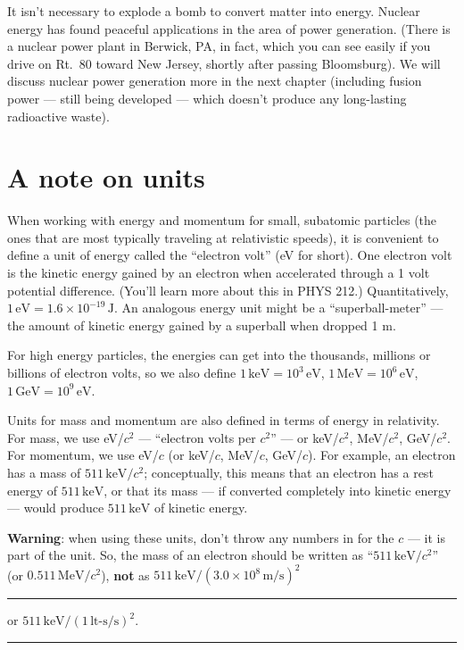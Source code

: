 \begin{itemize}
It isn't necessary to explode a bomb to convert matter into energy.
Nuclear energy has found peaceful applications in the area of power
generation. (There is a nuclear power plant in Berwick, PA, in fact,
which you can see easily if you drive on Rt.~80 toward New Jersey,
shortly after passing Bloomsburg).  We will discuss nuclear power
generation more in the next chapter (including fusion power ---  still
being developed --- which doesn't produce any long-lasting radioactive
waste).

\end{itemize}

\section{A note on units}
\label{sec:rel-units}

When working with energy and momentum for small, subatomic particles
(the ones that are most typically traveling at relativistic speeds),
it is convenient to define a unit of energy called the ``electron
volt'' (eV for short).  One electron volt is the kinetic energy gained
by an electron when accelerated through a 1 volt potential difference.
(You'll learn more about this in PHYS 212.)  Quantitatively, $1\,\text{eV} =
1.6\times 10^{-19}\,\text{J}$.  An analogous energy unit might be a
``superball-meter'' --- the amount of kinetic energy gained by a
superball when dropped 1 m.
    
For high energy particles, the energies can get into the thousands,
millions or billions of electron volts, so we also define 
$1\,\text{keV} = 10^3\,\text{eV}$, $1\,\text{MeV} = 10^6\,\text{eV}$,
$1\,\text{GeV} = 10^9\,\text{eV}$.
    
Units for mass and momentum are also defined in terms of energy in
relativity.  For mass, we use eV/$c^2$ --- ``electron volts per
$c^2$'' --- or keV/$c^2$, MeV/$c^2$, GeV/$c^2$.  For momentum, we use
eV/$c$ (or keV/$c$, MeV/$c$, GeV/$c$).  For example, an electron has a
mass of $511\,\text{keV}/c^2$; conceptually, this means that an electron 
has a rest energy of $511\,\text{keV}$, or that its mass --- if converted 
completely into kinetic energy --- would produce $511\,\text{keV}$ of 
kinetic energy.
  
\textbf{Warning}: when using these units, don't throw any numbers in for
the $c$ --- it is part of the unit.  So, the mass of an electron
should be written as ``$511\,\text{keV}/c^2$'' (or $0.511\,\text{MeV}/c^2$), 
\textbf{not} as $511\,\text{keV}/(3.0\times 10^8\,\text{m/s})^2$ \hspace{-1.7in}\rule[1mm]{42mm}{.2mm} 
or $511\,\text{keV}/(1\,\text{lt-s/s})^2$.\hspace{-1.25in}\rule[1mm]{30mm}{.2mm}


